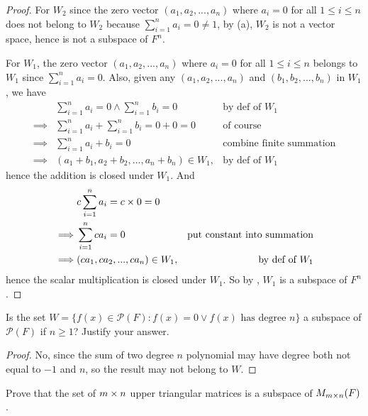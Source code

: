 \begin{proof}
For \(W_2\) since the zero vector \((a_1, a_2, ..., a_n)\) where \(a_i = 0\) for all \(1 \le i \le n\) does not belong to \(W_2\) because \(\sum_{i = 1}^{n} a_i = 0 \ne 1\), by (a), \(W_2\) is not a vector space, hence is not a subspace of \(F^n\).

For \(W_1\), the zero vector \((a_1, a_2, ..., a_n)\) where \(a_i = 0\) for all \(1 \le i \le n\) belongs to \(W_1\) since \(\sum_{i = 1}^{n} a_i = 0\).
Also, given any \((a_1, a_2, ..., a_n)\) and \((b_1, b_2, ..., b_n)\) in \(W_1\), we have
\begin{align*}
             & \sum_{i = 1}^{n} a_i = 0 \land \sum_{i = 1}^{n} b_i = 0 & \text{by def of \(W_1\)} \\
    \implies & \sum_{i = 1}^{n} a_i + \sum_{i = 1}^{n} b_i = 0 + 0 = 0 & \text{of course} \\
    \implies & \sum_{i = 1}^{n} a_i + b_i = 0 & \text{combine finite summation} \\
    \implies & (a_1 + b_1, a_2 + b_2, ..., a_n + b_n) \in W_1, & \text{by def of \(W_1\)}
\end{align*}
hence the addition is closed under \(W_1\).
And
\begin{align*}
             & c \sum_{i = 1}^{n} a_i = c \times 0 = 0 \\
    \implies & \sum_{i = 1}^{n} c a_i = 0 & \text{put constant into summation} \\
    \implies & (c a_1, c a_2, ..., c a_n) \in W_1, & \text{by def of \(W_1\)}
\end{align*}
hence the scalar multiplication is closed under \(W_1\).
So by , \(W_1\) is a subspace of \(F^n\).
\end{proof}

\begin{exercise} \label{exercise 1.3.11}
Is the set \(W = \{f(x) \in \mathcal{P}(F): f(x) = 0 \lor f(x) \text{ has degree } n\}\) a subspace of \(\mathcal{P}(F)\) if \(n \ge 1\)?
Justify your answer.
\end{exercise}

\begin{proof}
No, since the sum of two degree \(n\) polynomial may have degree both not equal to \(-1\) and \(n\), so the result may not belong to \(W\).
\end{proof}

\begin{exercise} \label{exercise 1.3.12}
Prove that the set of \(m \times n\) upper triangular matrices is a subspace of \(M_{m \times n}(F)\).
\end{exercise}

